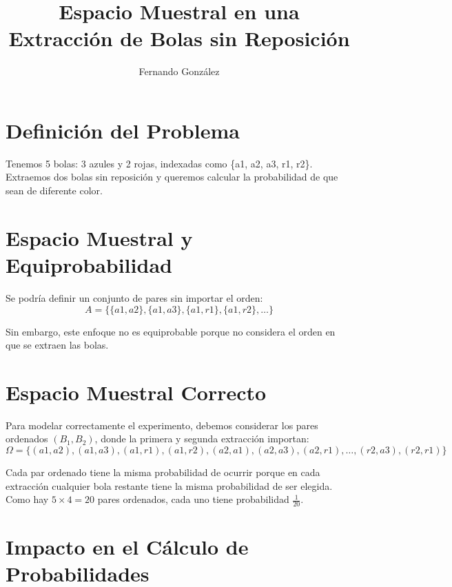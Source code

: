 \documentclass{article}
\begin{document}
	
	\title{Espacio Muestral en una Extracción de Bolas sin Reposición}
	\author{Fernando González}
	\date{}
	\maketitle
	
	\section{Definición del Problema}
	
	Tenemos 5 bolas: 3 azules y 2 rojas, indexadas como \{a1, a2, a3, r1, r2\}. Extraemos dos bolas sin reposición y queremos calcular la probabilidad de que sean de diferente color.
	
	\section{Espacio Muestral y Equiprobabilidad}
	
	Se podría definir un conjunto de pares sin importar el orden:
	\begin{equation*}
		A = \{ \{a1, a2\}, \{a1, a3\}, \{a1, r1\}, \{a1, r2\}, \dots \}
	\end{equation*}
	
	Sin embargo, este enfoque no es equiprobable porque no considera el orden en que se extraen las bolas.
	
	\section{Espacio Muestral Correcto}
	
	Para modelar correctamente el experimento, debemos considerar los pares ordenados \((B_1, B_2)\), donde la primera y segunda extracción importan:
	\begin{equation*}
		\Omega = \{ (a1, a2), (a1, a3), (a1, r1), (a1, r2), (a2, a1), (a2, a3), (a2, r1), \dots, (r2, a3), (r2, r1) \}
	\end{equation*}
	
	Cada par ordenado tiene la misma probabilidad de ocurrir porque en cada extracción cualquier bola restante tiene la misma probabilidad de ser elegida. Como hay $5 \times 4 = 20$ pares ordenados, cada uno tiene probabilidad $\frac{1}{20}$.
	
	\section{Impacto en el Cálculo de Probabilidades}
	
\end{document}
